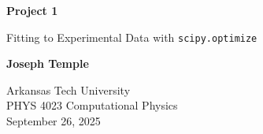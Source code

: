 
\begin{titlepage}
    \begin{center}
        \vspace*{1cm}
 
        \huge
        \textbf{Project 1}
 
        \Large
        Fitting to Experimental Data with \verb|scipy.optimize|
             

        \vfill

        \textbf{Joseph Temple}
        
 
        \vfill

        Arkansas Tech University \\
        PHYS 4023 Computational Physics \\
        September 26, 2025  
    \end{center}
 \end{titlepage}
